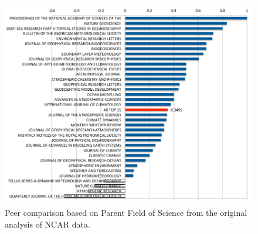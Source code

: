 \documentclass[10pt, conference, compsocconf]{IEEEtran}
\begin{document}
\begin{figure}[H]
  \centering 
    \includegraphics[width=1.0\columnwidth]{images-new/ncar-c.pdf} 
\vspace{-18pt}
  \caption{Peer comparison based on Parent Field of Science from the original analysis of NCAR data.}\label{F:ncar-score}
\end{figure} 
\end{document}
